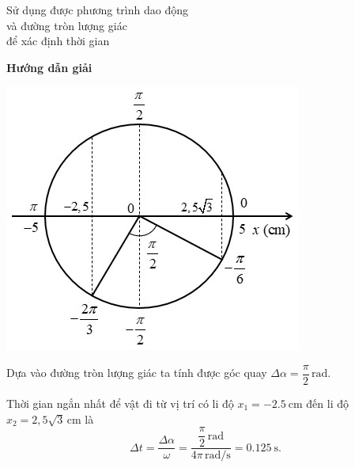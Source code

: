 \begin{dang}{Sử dụng được phương trình dao động\\ và đường tròn lượng giác\\ để xác định thời gian}
	{\begin{center}
			\textbf{Hướng dẫn giải}
		\end{center}
		
		\begin{center}
			\includegraphics[scale=0.8]{../figs/VN12-PH-02-A-001-7-V2-2.jpg}
		\end{center}
		
		Dựa vào đường tròn lượng giác ta tính được góc quay $\Delta\alpha=\dfrac{\pi}{2}\,\text{rad}$.
		
		Thời gian ngắn nhất để vật đi từ vị trí có li độ $x_1=\SI{-2,5}{\centi\meter}$ đến li độ $x_2=2,5\sqrt{3}\,\text{cm}$ là
		\begin{equation*}
			\Delta t=\dfrac{\Delta\alpha}{\omega}=\dfrac{\dfrac{\pi}{2}\,\text{rad}}{4\pi\,\text{rad/s}}=\SI{0,125}{\second}.
		\end{equation*}
		
}
\end{dang}
